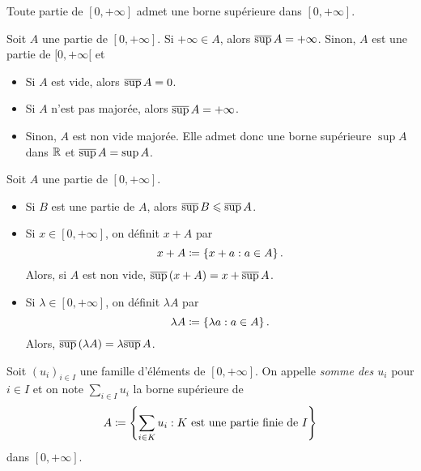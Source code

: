 \documentclass{magnolia}
\begin{document}
\begin{proposition}
Toute partie de $[0,+\infty]$ admet une borne supérieure dans $[0,+\infty]$.
\end{proposition}

\begin{remarques}
\remarque Soit $A$ une partie de $[0,+\infty]$. Si $+\infty\in A$, alors $\overline{\sup}\, A=+\infty$. Sinon,
  $A$ est une partie de $[0,+\infty[$ et
  \begin{itemize}
  \item Si $A$ est vide, alors $\overline{\sup}\, A=0$.
  \item Si $A$ n'est pas majorée, alors $\overline{\sup}\, A=+\infty$. 
  \item Sinon, $A$ est non vide majorée. Elle admet donc une borne supérieure $\sup A$
    dans $\mathbb{R}$ et $\overline{\sup}\, A=\sup A$.
  \end{itemize}
\remarque Soit $A$ une partie de $[0,+\infty]$.
  \begin{itemize}
  \item Si $B$ est une partie de $A$, alors $\overline{\sup}\, B\leqslant\overline{\sup}\, A$.
  \item Si $x\in [0,+\infty]$, on définit $x+A$ par
    \[x+A\coloneqq \left\{x+a : a\in A\right\}.\]
    Alors, si $A$ est non vide, $\overline{\sup}\,(x+A)=x+\overline{\sup}\, A$.
  \item Si $\lambda\in[0,+\infty]$, on définit $\lambda A$ par
    \[\lambda A\coloneqq \left\{\lambda a : a\in A\right\}.\]
    Alors, $\overline{\sup}\,(\lambda A)=\lambda\overline{\sup}\, A$.
  \end{itemize}
\end{remarques}

\begin{definition}
Soit $(u_i)_{i\in I}$ une famille d'éléments de $[0,+\infty]$. On appelle \emph{somme des $u_i$}
pour $i\in I$ et on note $\sum_{i\in I} u_i$ la borne supérieure de
\[A\coloneqq\left\{\sum_{i\in K} u_i : \text{$K$ est une partie finie de $I$}\right\}\]
dans $[0,+\infty]$.
\end{definition}
\end{document}
